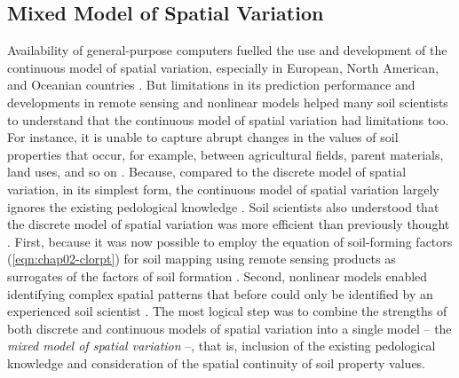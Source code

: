 \subsection{Mixed Model of Spatial Variation}

Availability of general-purpose computers fuelled the use and development of the continuous model of spatial 
variation, especially in European, North American, and Oceanian countries \cite{HeuvelinkEtAl2001, 
McBratneyEtAl2003, ScullEtAl2003}. But limitations in its prediction performance and developments in remote 
sensing and nonlinear models helped many soil scientists to understand that the continuous model of
spatial variation had limitations too. For instance, it is unable to capture abrupt changes in the values of 
soil properties that occur, for example, between agricultural fields, parent materials, land uses, and so on
\cite{SteinEtAl1988, VoltzEtAl1990}. Because, compared to the discrete model of spatial variation, in its 
simplest form, the continuous model of spatial variation largely ignores the existing pedological knowledge
\cite{Grunwald2009, Lark2012}. Soil scientists also understood that the discrete model of spatial variation 
was more efficient than previously thought \cite{BregtEtAl1987, HeuvelinkEtAl2001}. First, because it was now
possible to employ the equation of soil-forming factors (\autoref{eqn:chap02-clorpt}) for soil mapping using 
remote sensing products as surrogates of the factors of soil formation \cite{MooreEtAl1993}. Second, 
nonlinear models enabled identifying complex spatial patterns that before could only be identified 
by an experienced soil scientist \cite{McKenzieEtAl1999}. The most logical step was to combine the strengths 
of both discrete and continuous models of spatial variation into a single model -- the \emph{mixed model of 
spatial variation} --, that is, inclusion of the existing pedological knowledge and consideration of the 
spatial continuity of soil property values.

\def\footmixed{\footnote{The use that I give to the expression \emph{mixed model of spatial variation} in this 
thesis is approximately equivalent to expressions such as regression-kriging, kriging with external drift, 
universal kriging, hybrid approach for soil mapping, pedometric mapping, digital soil mapping, predictive soil 
mapping, environmental correlation, geostatistical mapping, soil-landscape modelling, and so on. As far as I 
know, soil spatial modellers have not yet reached an agreement on how these \q{traditional} expressions should 
be used, nor what their \q{correct} meaning is. See, for example, \citeonline{Hengl2003, McBratneyEtAl2003, 
ScullEtAl2003}. Because the expression \emph{mixed model of spatial variation} has a stronger theoretical 
basis (other expressions are defined based on operational aspects), I understand that its adoption and use is 
a more appropriate choice.}}

